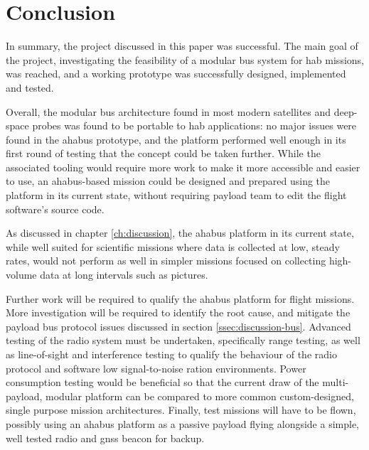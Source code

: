 \chapter{Conclusion}
\label{ch:conclusion}

In summary, the project discussed in this paper was successful. The main goal of the project, investigating the feasibility of a modular bus system for \acrlong{hab} missions, was reached, and a working prototype was successfully designed, implemented and tested.

Overall, the modular bus architecture found in most modern satellites and deep-space probes was found to be portable to \acrlong{hab} applications: no major issues were found  in the \acrshort{ahabus} prototype, and the platform performed well enough in its first round of testing that the concept could be taken further. While the associated tooling would require more work to make it more accessible and easier to use, an \acrshort{ahabus}-based mission could be designed and prepared using the platform in its current state, without requiring payload team to edit the flight software's source code.

As discussed in chapter \ref{ch:discussion}, the \acrshort{ahabus} platform in its current state, while well suited for scientific missions where data is collected at low, steady rates, would not perform as well in simpler missions focused on collecting high-volume data at long intervals such as pictures.

Further work will be required to qualify the \acrshort{ahabus} platform for flight missions. More investigation will be required to identify the root cause, and mitigate the payload bus protocol issues discussed in section \ref{ssec:discussion-bus}. Advanced testing of the radio system must be undertaken, specifically range testing, as well as line-of-sight and interference testing to qualify the behaviour of the radio protocol and software low signal-to-noise ration environments. Power consumption testing would be beneficial so that the current draw of the multi-payload, modular platform can be compared to more common custom-designed, single purpose mission architectures. Finally, test missions will have to be flown, possibly using an \acrshort{ahabus} platform as a passive payload flying alongside a simple, well tested radio and \acrshort{gnss} beacon for backup.

